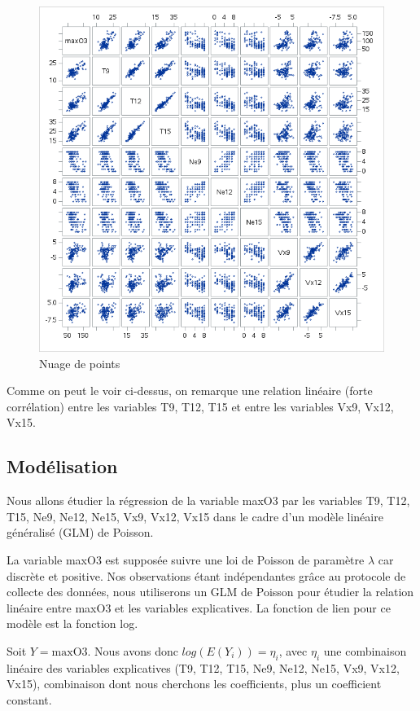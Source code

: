 \documentclass[12pt,a4paper]{article}
\begin{document}
\begin{figure}[H]
	\centering
	\includegraphics[width=\textwidth]{Nuage_de_point.png}
	\caption{Nuage de points}
	\label{fig:nuage_de_points}
\end{figure}

Comme on peut le voir ci-dessus, on remarque une relation linéaire (forte corrélation) entre les variables T9, T12, T15 et entre les variables Vx9, Vx12, Vx15.

\subsection{Modélisation}
Nous allons étudier la régression de la variable maxO3 par les variables T9, T12, T15, Ne9, Ne12, Ne15, Vx9, Vx12, Vx15 dans le cadre d'un modèle linéaire généralisé (GLM) de Poisson.

La variable maxO3 est supposée suivre une loi de Poisson de paramètre $\lambda$ car discrète et positive. Nos observations étant indépendantes grâce au protocole de collecte des données, nous utiliserons un GLM de Poisson pour étudier la relation linéaire entre maxO3 et les variables explicatives. La fonction de lien pour ce modèle est la fonction log.

Soit $Y = \text{maxO3}$. Nous avons donc $log(E(Y_i)) = \eta_i$, avec $\eta_i$ une combinaison linéaire des variables explicatives (T9, T12, T15, Ne9, Ne12, Ne15, Vx9, Vx12, Vx15), combinaison dont nous cherchons les coefficients, plus un coefficient constant.
\end{document}
